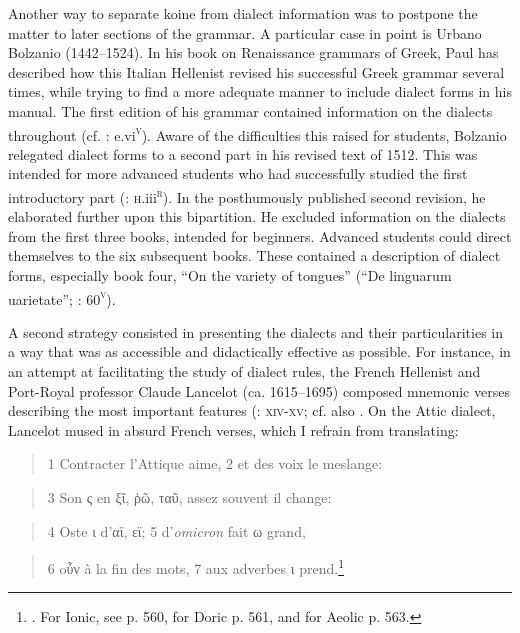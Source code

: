 Another way to separate koine from dialect information was to postpone the matter to later sections of the grammar. A particular case in point is Urbano Bolzanio (1442–1524). In his book on Renaissance grammars of Greek, Paul \citet[36-40]{Botley2010} has described how this Italian Hellenist revised his successful Greek grammar several times, while trying to find a more adequate manner to include dialect forms in his manual. The first edition of his grammar contained information on the dialects throughout (cf. \citealt{Bolzanio1497}: e.vi\textsc{\textsuperscript{v}}). Aware of the difficulties this raised for students, Bolzanio relegated dialect forms to a second part in his revised text of 1512. This was intended for more advanced students who had successfully studied the first introductory part (\citealt{Bolzanio1512}: \textsc{h}.iii\textsc{\textsuperscript{r}}). In the posthumously published second revision, he elaborated further upon this bipartition. He excluded information on the dialects from the first three books, intended for beginners. Advanced students could direct themselves to the six subsequent books. These contained a description of dialect forms, especially book four, “On the variety of tongues” (“De linguarum uarietate”; \citealt{Bolzanio1545}: 60\textsc{\textsuperscript{v}}).

A second strategy consisted in presenting the dialects and their particularities in a way that was as accessible and didactically effective as possible. For instance, in an attempt at facilitating the study of dialect rules, the French Hellenist and Port-Royal professor Claude Lancelot (ca. 1615–1695) composed mnemonic verses describing the most important features (\citealt{Lancelot1655}: \textsc{xiv-xv;} cf. also \citet[]{Anon.1725}. On the Attic dialect, Lancelot mused in absurd French verses, which I refrain from translating:

\begin{quote}
1 Contracter l’Attique aime, 2 et des voix le meslange:
\end{quote}

\begin{quote}
3 Son ς en ξῖ, ῥῶ, ταῦ, assez souvent il change:
\end{quote}

\begin{quote}
4 Oste ι d’αϊ, εϊ; 5 d’\textit{omicron} fait ω grand,
\end{quote}

\begin{quote}
6 oὖν à la fin des mots, 7 aux adverbes ι prend.\footnote{\citet[558]{Lancelot1655}. For Ionic, see p. 560, for Doric p. 561, and for Aeolic p. 563.}
\end{quote}

